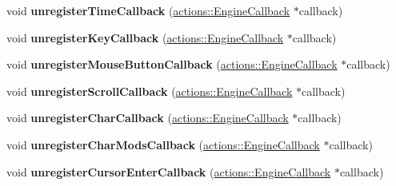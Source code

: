 \begin{DoxyCompactItemize}
\item 
\hypertarget{classfillwave_1_1Engine_a2ae2ac7c85fa6bf5637ed637cb1967ad}{}void {\bfseries unregister\+Time\+Callback} (\hyperlink{classfillwave_1_1actions_1_1EngineCallback}{actions\+::\+Engine\+Callback} $\ast$callback)\label{classfillwave_1_1Engine_a2ae2ac7c85fa6bf5637ed637cb1967ad}

\item 
\hypertarget{classfillwave_1_1Engine_a968d602d19efb22437785f6f02e5b443}{}void {\bfseries unregister\+Key\+Callback} (\hyperlink{classfillwave_1_1actions_1_1EngineCallback}{actions\+::\+Engine\+Callback} $\ast$callback)\label{classfillwave_1_1Engine_a968d602d19efb22437785f6f02e5b443}

\item 
\hypertarget{classfillwave_1_1Engine_abc88a56c69f1cc61ecf6595eceaefee3}{}void {\bfseries unregister\+Mouse\+Button\+Callback} (\hyperlink{classfillwave_1_1actions_1_1EngineCallback}{actions\+::\+Engine\+Callback} $\ast$callback)\label{classfillwave_1_1Engine_abc88a56c69f1cc61ecf6595eceaefee3}

\item 
\hypertarget{classfillwave_1_1Engine_a8ea4a2c2f01264900ba83ba34793cbb6}{}void {\bfseries unregister\+Scroll\+Callback} (\hyperlink{classfillwave_1_1actions_1_1EngineCallback}{actions\+::\+Engine\+Callback} $\ast$callback)\label{classfillwave_1_1Engine_a8ea4a2c2f01264900ba83ba34793cbb6}

\item 
\hypertarget{classfillwave_1_1Engine_aaa2bd3c27bae270db09659340516e28d}{}void {\bfseries unregister\+Char\+Callback} (\hyperlink{classfillwave_1_1actions_1_1EngineCallback}{actions\+::\+Engine\+Callback} $\ast$callback)\label{classfillwave_1_1Engine_aaa2bd3c27bae270db09659340516e28d}

\item 
\hypertarget{classfillwave_1_1Engine_a40443d71d58c2020cd0d58cf7d3d8ca7}{}void {\bfseries unregister\+Char\+Mods\+Callback} (\hyperlink{classfillwave_1_1actions_1_1EngineCallback}{actions\+::\+Engine\+Callback} $\ast$callback)\label{classfillwave_1_1Engine_a40443d71d58c2020cd0d58cf7d3d8ca7}

\item 
\hypertarget{classfillwave_1_1Engine_a0f471e0ff7fb90cebec3a2d81af7365f}{}void {\bfseries unregister\+Cursor\+Enter\+Callback} (\hyperlink{classfillwave_1_1actions_1_1EngineCallback}{actions\+::\+Engine\+Callback} $\ast$callback)\label{classfillwave_1_1Engine_a0f471e0ff7fb90cebec3a2d81af7365f}


\end{DoxyCompactItemize}
